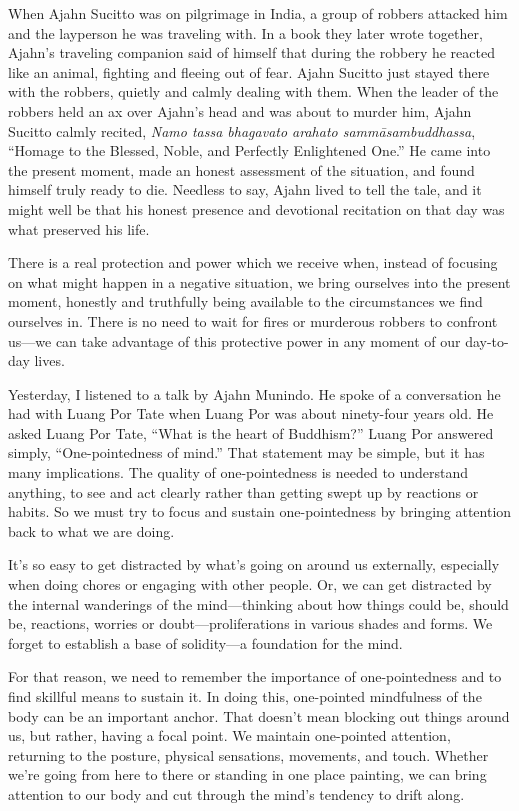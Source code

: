 When Ajahn Sucitto was on pilgrimage in India, a group of robbers 
attacked him and the layperson he was traveling with. In a book they 
later wrote together, Ajahn's traveling companion said of himself that 
during the robbery he reacted like an animal, fighting and fleeing out 
of fear. Ajahn Sucitto just stayed there with the robbers, quietly and 
calmly dealing with them. When the leader of the robbers held an ax 
over Ajahn's head and was about to murder him, Ajahn Sucitto calmly 
recited, \emph{Namo tassa bhagavato arahato sammāsambuddhassa}, 
``Homage to the Blessed, Noble, and Perfectly Enlightened One.'' He 
came into the present moment, made an honest assessment of the 
situation, and found himself truly ready to die. Needless to say, Ajahn 
lived to tell the tale, and it might well be that his honest presence 
and devotional recitation on that day was what preserved his life.

There is a real protection and power which we receive when, instead of 
focusing on what might happen in a negative situation, we bring 
ourselves into the present moment, honestly and truthfully being 
available to the circumstances we find ourselves in. There is no need 
to wait for fires or murderous robbers to confront us---we can take 
advantage of this protective power in any moment of our day-to-day 
lives.


Yesterday, I listened to a talk by Ajahn Munindo. He spoke of a 
conversation he had with Luang Por Tate when Luang Por was about 
ninety-four years old. He asked Luang Por Tate, ``What is the heart of 
Buddhism?'' Luang Por answered simply, ``One-pointedness of mind.'' 
That statement may be simple, but it has many implications. The quality 
of one-pointedness is needed to understand anything, to see and act 
clearly rather than getting swept up by reactions or habits. So we must 
try to focus and sustain one-pointedness by bringing attention back to 
what we are doing.

It's so easy to get distracted by what's going on around us externally, 
especially when doing chores or engaging with other people. Or, we can 
get distracted by the internal wanderings of the mind---thinking about 
how things could be, should be, reactions, worries or 
doubt---proliferations in various shades and forms. We forget to 
establish a base of solidity---a foundation for the mind.

For that reason, we need to remember the importance of one-pointedness 
and to find skillful means to sustain it. In doing this, one-pointed 
mindfulness of the body can be an important anchor. That doesn't mean 
blocking out things around us, but rather, having a focal point. We 
maintain one-pointed attention, returning to the posture, physical 
sensations, movements, and touch. Whether we're going from here to 
there or standing in one place painting, we can bring attention to our 
body and cut through the mind's tendency to drift along.

